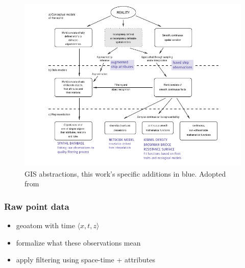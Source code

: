 

\begin{figure}[htbp]
  \centering
  \includegraphics[width=160mm]{figures/representation-in-gis.pdf}
  \caption{GIS abstractions, this work's specific {\color{DBlue} additions in blue}. Adopted from \cite{Bivand2011}}
  \label{fig:representation-in-gis}
\end{figure}




\subsubsection{Raw point data}
 \begin{itemize}
   \item geoatom with time $\langle x,t,z \rangle$
   \item formalize what these observations mean
   \item apply filtering using space-time + attributes
 \end{itemize}

